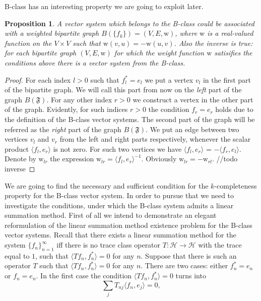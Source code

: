 \documentclass[12pt]{article}
\newcommand\inner[2]{\langle #1, #2 \rangle}
\renewcommand{\cal}[1]{\mathcal{#1}}
\newtheorem{prop}{Proposition}
\theoremstyle{definition}
\newcommand{\seq}[1]{\{{#1}_n\}_{n=1}^\infty}
\newcommand{\fsys}{\mathfrak{F}}
\newcommand{\wt}{\mathrm{w}}
\numberwithin{remark}{section}
\numberwithin{theorem}{section}
\numberwithin{prop}{section}
\numberwithin{equation}{section}
\numberwithin{lemma}{section}
\numberwithin{prop_under_lemma}{lemma}
\begin{document}
    B-class has an interesting property we are going to exploit later.
    \begin{prop}
        A vector system which belongs to the B-class could be associated with a 
        weighted bipartite graph $B(\{f_k\}) = (V, E, \wt)$, where $\wt$ is a
        real-valued function on the $V\times V$ such that $\wt(v, u) = -\wt(u, v)$.
        Also the inverse is true: for each bipartite graph $(V, E, \wt)$ for which the weight function
        $\wt$ satisifies the conditions above there is a vector system from the B-class.
    \end{prop}
    \begin{proof}
        For each index $l > 0$ such that $f^*_l = e_l$ we put a vertex $v_l$ in the first part of the bipartite graph.
        We will call this part from now on the \textit{left} part of the graph $B(\fsys)$.
        For any other index $r > 0$ we construct a vertex in the other part of the graph.
        Evidently, for such indices $r > 0$ the condition $f_r = e_r$ holds due to the definition of the B-class vector systems.
        The second part of the graph will be referred as the \textit{right} part of the graph $B(\fsys)$.
        We put an edge between two vertices $v_l$ and $v_r$ from the left and right parts respectively,
        whenever the scalar product $\inner{f_l}{e_r}$ is not zero.
        For such two vertices we have $\inner{f_l}{e_r}$ = $-\inner{f_r}{e_l}$.
        Denote by $\wt_{lr}$ the expression $\wt_{lr} = \inner{f_l}{e_r}^{-1}$.
        Obviously $\wt_{lr} = -\wt_{rl}$.
        //todo inverse
    \end{proof}
    We are going to find the necessary and sufficient condition for the $k$-completeness property for the B-class vector system.
    In order to pursue that we need to investigate the conditions, under which the B-class system admits a linear summation method.
    First of all we intend to demonstrate an elegant reformulation of the linear summation method existence problem for
      the B-class vector systems.
    Recall that there exists a linear summation method for the system $\seq{f}$
      iff there is no trace class operator $T: \cal{H} \to \cal{H}$ with the trace equal to $1$,
      such that $\inner{Tf_n}{f_n^*} = 0$ for any $n$.
    Suppose that there is such an operator $T$ such that $\inner{Tf_n}{f_n^*} = 0$ for any $n$.
    There are two cases: either $f^*_n = e_n$ or $f_n = e_n$.
    In the first case the condition $\inner{Tf_n}{f_n^*} = 0$ turns into
    \begin{equation}
        \label{left-eqn}
        \sum_j T_{nj} \inner{f_n}{e_j} = 0,
    \end{equation}
\end{document}
